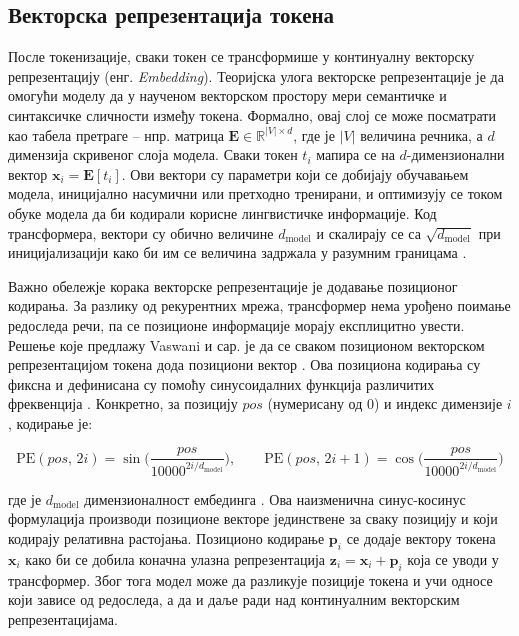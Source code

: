 \documentclass[a4paper, 12pt, master, utf8]{etf}
\begin{document}
\subsection{Векторска репрезентација токена}

После токенизације, сваки токен се трансформише у континуалну векторску репрезентацију (енг. \textit{Embedding}). Теоријска улога векторске репрезентације је да омогући моделу да у наученом векторском простору мери семантичке и синтаксичке сличности између токена. Формално, овај слој се може посматрати као табела претраге -- нпр. матрица $\mathbf{E} \in \mathbb{R}^{|V| \times d}$, где је $|V|$ величина речника, а $d$ димензија скривеног слоја модела. Сваки токен $t_i$ мапира се на $d$-димензионални вектор $\mathbf{x}_i = \mathbf{E}[t_i]$. Ови вектори су параметри који се добијају обучавањем модела, иницијално насумични или претходно тренирани, и оптимизују се током обуке модела да би кодирали корисне лингвистичке информације. Код трансформера, вектори су обично величине $d_{\text{model}}$ и скалирају се са $\sqrt{d_{\text{model}}}$ при иницијализацији како би им се величина задржала у разумним границама \cite{vaswani_attention_2017}.

Важно обележје корака векторске репрезентације је додавање позиционог кодирања. За разлику од рекурентних мрежа, трансформер нема урођено поимање редоследа речи, па се позиционе информације морају експлицитно увести. Решење које предлажу Vaswani и сар. је да се сваком позиционом векторском репрезентацијом токена дода позициони вектор \cite{vaswani_attention_2017}. Ова позициона кодирања су фиксна и дефинисана су помоћу синусоидалних функција различитих фреквенција \cite{vaswani_attention_2017}. Конкретно, за позицију $pos$ (нумерисану од 0) и индекс димензије $i$, кодирање је:

\begin{equation}
\text{PE}(pos,\,2i) = \sin\!\Big(\frac{pos}{10000^{2i/d_{\text{model}}}}\Big), \qquad \text{PE}(pos,\,2i+1) = \cos\!\Big(\frac{pos}{10000^{2i/d_{\text{model}}}}\Big)
\label{eq:positional_encoding}
\end{equation}

где је $d_{\text{model}}$ димензионалност ембединга \cite{vaswani_attention_2017}. Ова наизменична синус-косинус формулација производи позиционе векторе јединствене за сваку позицију и који кодирају релативна растојања. Позиционо кодирање $\mathbf{p}_i$ се додаје вектору токена $\mathbf{x}_i$ како би се добила коначна улазна репрезентација $\mathbf{z}_i = \mathbf{x}_i + \mathbf{p}_i$ која се уводи у трансформер. Због тога модел може да разликује позиције токена и учи односе који зависе од редоследа, а да и даље ради над континуалним векторским репрезентацијама.
\end{document}
